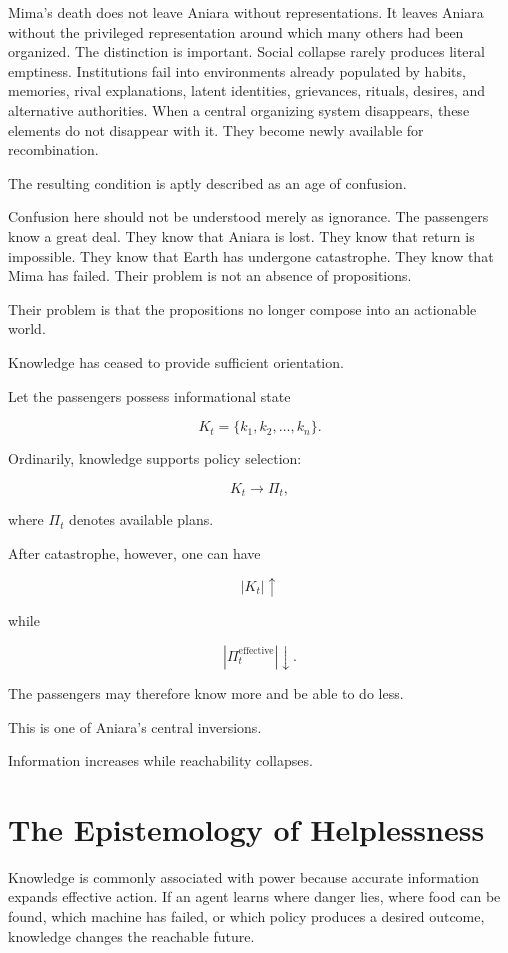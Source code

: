 \documentclass[11pt,oneside]{book}
\theoremstyle{definition}
\theoremstyle{remark}
\begin{document}
Mima's death does not leave Aniara without representations. It leaves Aniara without the privileged representation around which many others had been organized. The distinction is important. Social collapse rarely produces literal emptiness. Institutions fail into environments already populated by habits, memories, rival explanations, latent identities, grievances, rituals, desires, and alternative authorities. When a central organizing system disappears, these elements do not disappear with it. They become newly available for recombination.

The resulting condition is aptly described as an age of confusion.

Confusion here should not be understood merely as ignorance. The passengers know a great deal. They know that Aniara is lost. They know that return is impossible. They know that Earth has undergone catastrophe. They know that Mima has failed. Their problem is not an absence of propositions.

Their problem is that the propositions no longer compose into an actionable world.

Knowledge has ceased to provide sufficient orientation.

Let the passengers possess informational state

\[
K_t=\{k_1,k_2,\ldots,k_n\}.
\]

Ordinarily, knowledge supports policy selection:

\[
K_t\rightarrow\Pi_t,
\]

where \(\Pi_t\) denotes available plans.

After catastrophe, however, one can have

\[
|K_t|\uparrow
\]

while

\[
|\Pi_t^{\mathrm{effective}}|\downarrow.
\]

The passengers may therefore know more and be able to do less.

This is one of Aniara's central inversions.

Information increases while reachability collapses.

\section{The Epistemology of Helplessness}

Knowledge is commonly associated with power because accurate information expands effective action. If an agent learns where danger lies, where food can be found, which machine has failed, or which policy produces a desired outcome, knowledge changes the reachable future.
\end{document}
